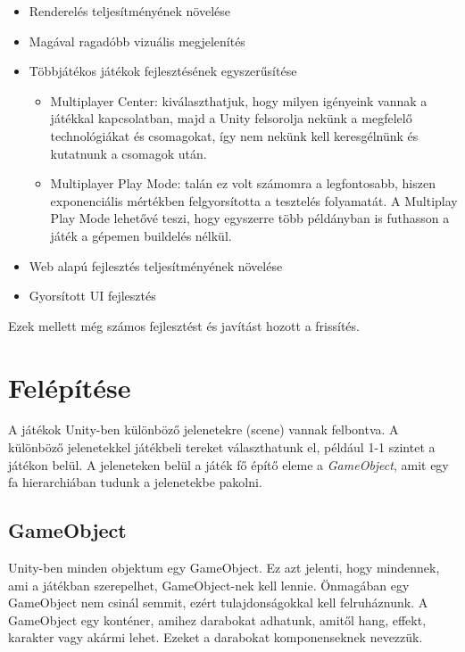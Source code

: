 \documentclass[]{thesis-ekf}
\theoremstyle{definition}
\theoremstyle{remark}
\begin{document}
\begin{itemize}
	\item Renderelés teljesítményének növelése
	\item Magával ragadóbb vizuális megjelenítés
	\item Többjátékos játékok fejlesztésének egyszerűsítése
	\begin{itemize}
		\item Multiplayer Center: kiválaszthatjuk, hogy milyen igényeink vannak a játékkal kapcsolatban, majd a Unity felsorolja nekünk a megfelelő technológiákat és csomagokat, így nem nekünk kell keresgélnünk és kutatnunk a csomagok után.
		\item Multiplayer Play Mode: talán ez volt számomra a legfontosabb, hiszen exponenciális mértékben felgyorsította a tesztelés folyamatát. A Multiplay Play Mode lehetővé teszi, hogy egyszerre több példányban is futhasson a játék a gépemen buildelés nélkül.
	\end{itemize}
	\item Web alapú fejlesztés teljesítményének növelése
	\item Gyorsított UI fejlesztés
\end{itemize}

Ezek mellett még számos fejlesztést és javítást hozott a frissítés. \cite{Unity6Features}

\section{Felépítése}

A játékok Unity-ben különböző jelenetekre (scene) vannak felbontva. A különböző jelenetekkel játékbeli tereket választhatunk el, például 1-1 szintet a játékon belül. A jeleneteken belül a játék fő építő eleme a \emph{GameObject}, amit egy fa hierarchiában tudunk a jelenetekbe pakolni. \cite{UnityScene}

\subsection{GameObject}
\label{subsec-gameobject}

Unity-ben minden objektum egy GameObject. Ez azt jelenti, hogy mindennek, ami a játékban szerepelhet, GameObject-nek kell lennie. Önmagában egy GameObject nem csinál semmit, ezért tulajdonságokkal kell felruháznunk. A GameObject egy konténer, amihez darabokat adhatunk, amitől hang, effekt, karakter vagy akármi lehet. Ezeket a darabokat komponenseknek nevezzük. \cite{UnityGameObjects}
\end{document}
